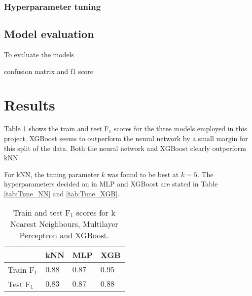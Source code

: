 \documentclass[a4paper, 11pt, twocolumn]{article}
\begin{document}
\subsubsection{Hyperparameter tuning}


\subsection{Model evaluation}
To evaluate the models 

confusion matrix and f1 score

\section{Results}

Table \ref{tab:F1} shows the train and test F$_1$ 
scores for the three models employed in this project. 
XGBoost seems to outperform the neural network by a
 small margin for this split of the data. Both the
  neural network and XGBoost clearly outperform kNN.
  
  For kNN, the tuning parameter $k$ was found to be best
  at $k=5$. The hyperparameters decided on in MLP and
  XGBoost are stated in Table \ref{tab:Tune_NN} and
   \ref{tab:Tune_XGB}.

\begin{table}
\centering
{}
\caption{Estimated hyperparameters for the neural network model employed in this project.}
\label{tab:Tune_NN}
\end{table}

\begin{table}
\centering
{}
\caption{Estimated hyperparameters for the XGB model employed in this project.}
\label{tab:Tune_XGB}
\end{table}

\begin{table}
\centering
\begin{tabular}{|llll|}
\hline
           & kNN & MLP & XGB \\
\hline
Train F$_1$ & $0.88$ & $0.87$ & $0.95$\\
Test F$_1$   & $0.83$ & $0.87$ & $0.88$\\
\hline
\end{tabular}
\caption{Train and test F$_1$ scores for k Nearest Neighbours, Multilayer Perceptron and XGBoost.}
\label{tab:F1}
\end{table}
\end{document}
